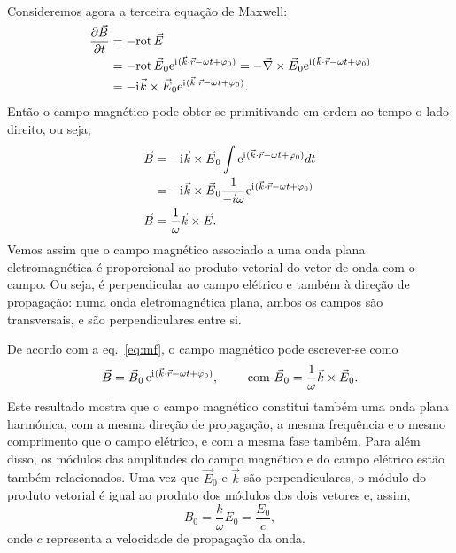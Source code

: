 Consideremos agora a terceira equação de Maxwell:
\begin{align*}
  \pd{\vec B}{t}&=-\rot\vec E\\
                &=-\rot \vec E_0\e^{\iu(\vec k\cdot\vec r-\omega t+\varphi_0)}
  =-\vec \nabla\times\vec E_0\e^{\iu(\vec k\cdot\vec r-\omega t+\varphi_0)}\\
  &=-\iu\vec k\times\vec E_0\e^{\iu(\vec k\cdot\vec r-\omega t+\varphi_0)}.
\end{align*}
Então o campo magnético pode obter-se primitivando em ordem ao tempo o lado
direito, ou seja,
\begin{align}
  \vec B&=-\iu\vec k\times\vec E_0\int\e^{\iu(\vec k\cdot\vec r-\omega
          t+\varphi_0)}dt\nonumber\\
          &=-\iu\vec k\times\vec E_0\frac{1}{-i\omega}
            \e^{\iu(\vec k\cdot\vec r-\omega t+\varphi_0)}\nonumber\\
            \vec B&=\frac{1}{\omega}\vec k\times \vec E.\label{eq:mf}
\end{align}
Vemos assim que o campo magnético associado a uma onda plana eletromagnética é
proporcional ao produto vetorial do vetor de onda com o campo. Ou seja,
é perpendicular ao campo elétrico e também à direção de propagação: numa onda
eletromagnética plana, ambos os campos são transversais, e são perpendiculares
entre si. 

De acordo com a eq.~\eqref{eq:mf}, o campo magnético pode escrever-se como
\begin{equation*}
  \vec B=\vec B_0\,\e^{\iu(\vec k\cdot\vec r-\omega t+\varphi_0)},\qquad
  \text{ com } 
  \vec B_0=\frac{1}{\omega}\vec k\times\vec E_0.
\end{equation*}
Este resultado mostra que o campo magnético constitui também uma onda plana
harmónica, com a mesma direção de propagação, a mesma frequência e o mesmo
comprimento que o campo elétrico, e com a mesma fase também. Para além disso, os
módulos das amplitudes do campo magnético e do campo elétrico estão também
relacionados. Uma vez que $\vec E_0$ e $\vec k$ são perpendiculares, o módulo do
produto vetorial é igual ao produto dos módulos dos dois vetores e, assim,
\begin{equation}\label{eq:b0e0}
  B_0 = \frac{k}{\omega}E_0=\frac{E_0}{c},
\end{equation}
onde $c$ representa a velocidade de propagação da onda.

